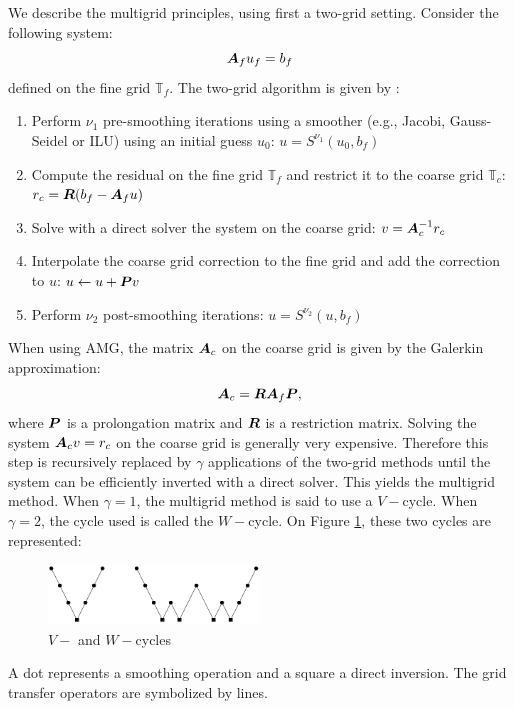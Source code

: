 We describe the multigrid principles, using first a two-grid setting. Consider
the following system:
\begin{equation}
  \boldsymbol{A}_f u_f = b_f
\end{equation}
defined on the fine grid $\mathbb{T}_f$.  The two-grid algorithm is given by :
\begin{enumerate}
  \item Perform $\nu_1$ pre-smoothing iterations using a smoother (e.g., Jacobi,
    Gauss-Seidel or ILU) using an initial guess $u_0$: $u = S^{\nu_1}(u_0,b_f)$
  \item Compute the residual on the fine grid $\mathbb{T}_f$ and restrict it to
    the coarse grid $\mathbb{T}_c$: $r_c = \boldsymbol{R}(b_f-\boldsymbol{A}_f u)$
  \item Solve with a direct solver the system on the coarse grid: 
    $v=\boldsymbol{A}_c^{-1} r_c$
  \item Interpolate the coarse grid correction to the fine grid and add the
    correction to $u$: $u \leftarrow u+\boldsymbol{P}v$
  \item Perform $\nu_2$ post-smoothing iterations: $u = S^{\nu_2}(u,b_f)$
\end{enumerate}
When using AMG, the matrix $\boldsymbol{A}_c$ on the coarse grid is given by the Galerkin
approximation:
\begin{equation}
  \boldsymbol{A}_c = \boldsymbol{R}\boldsymbol{A}_f \boldsymbol{P},
\end{equation}
where $\boldsymbol{P}$ is a prolongation matrix and $\boldsymbol{R}$ is a restriction matrix.
Solving the system $\boldsymbol{A}_c v = r_c$ on the coarse grid is generally very
expensive. Therefore this step is recursively replaced by $\gamma$ applications 
of the two-grid methods until the system can be efficiently inverted with a 
direct solver. This yields the multigrid method. 
When $\gamma=1$, the multigrid method is said to use a $V-$cycle. When
$\gamma=2$, the cycle used is called the $W-$cycle. On Figure \ref{v_w_cycles},
these two cycles are represented:
\begin{figure}[H]
  \centering
  \includegraphics[width=0.5\textwidth]{./Dsa/v_w_cycles}
  \caption{$V-$ and $W-$cycles}
  \label{v_w_cycles}
\end{figure}
A dot represents a smoothing operation and a square a direct inversion. The grid 
transfer operators are symbolized by lines.

